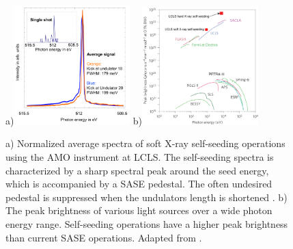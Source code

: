 \begin{figure}
	\centering
		a)\includegraphics[width=0.40\textwidth]{images/Soft-X-ray-self-seeding.png}
		b)\includegraphics[width=0.40\textwidth]{images/spectral-brightness-fletcher-2015-corr2.png}
	\caption[Soft X-ray self-seeding spectra and brilliance of various light sources.]{a) Normalized average spectra of soft X-ray self-seeding operations using the AMO instrument at LCLS. The self-seeding spectra is characterized by a sharp spectral peak around the seed energy, which is accompanied by a SASE pedestal. The often undesired pedestal is suppressed when the undulators length is shortened \cite{Bucher-2014-Unpublished}. b) The peak brightness of various light sources over a wide photon energy range. Self-seeding operations have a higher peak brightness than current SASE operations. Adapted from \cite{Fletcher-2015-NatPho,Ratner-2015-PRL}.}
	\label{fig:soft-xray-self-seeding}
\end{figure}
%
